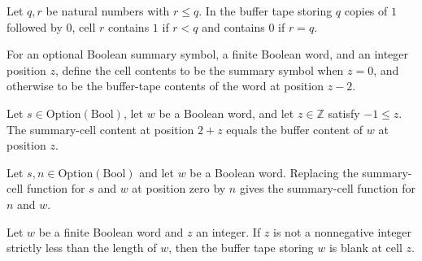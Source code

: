 \begin{lemma}
\label{Turing.StepBlock.bufferTape_unary}
\leanok
{}
Let $q,r$ be natural numbers with $r\le q$. In the buffer tape storing $q$ copies of $1$
followed by $0$, cell $r$ contains $1$ if $r<q$ and contains $0$ if $r=q$.
\end{lemma}

\begin{definition}
\label{Turing.StepBlock.summaryCells}
\leanok
{}
For an optional Boolean summary symbol, a finite Boolean word, and an integer position
$z$, define the cell contents to be the summary symbol when $z=0$, and otherwise to be
the buffer-tape contents of the word at position $z-2$.
\end{definition}

\begin{lemma}
\label{Turing.StepBlock.summaryCells_shift}
\leanok
{}
Let $s\in\mathrm{Option}(\mathrm{Bool})$, let $w$ be a Boolean word, and let
$z\in\mathbb Z$ satisfy $-1\le z$. The summary-cell content at position $2+z$ equals the
buffer content of $w$ at position $z$.
\end{lemma}

\begin{lemma}
\label{Turing.StepBlock.summaryCells_update}
\leanok
{}
Let $s,n\in\mathrm{Option}(\mathrm{Bool})$ and let $w$ be a Boolean word. Replacing the
summary-cell function for $s$ and $w$ at position zero by $n$ gives the summary-cell
function for $n$ and $w$.
\end{lemma}

\begin{lemma}
\label{Turing.StepBlock.bufferTape_outside}
\leanok
{}
Let $w$ be a finite Boolean word and $z$ an integer. If $z$ is not a nonnegative integer
strictly less than the length of $w$, then the buffer tape storing $w$ is blank at cell
$z$.
\end{lemma}

